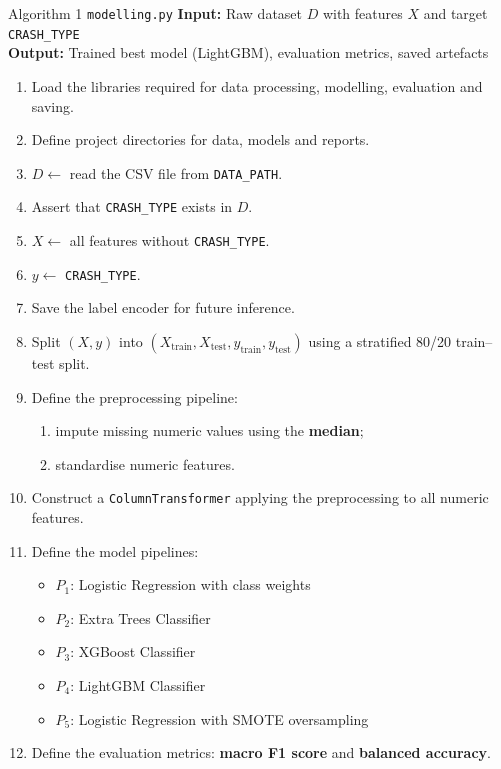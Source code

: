 \documentclass[11pt,a4paper]{article}
\newcommand{\feat}[1]{\texttt{#1}}
\begin{document}
\begin{algobox}{Algorithm 1 \quad \texttt{modelling.py}}
\textbf{Input:} Raw dataset $D$ with features $X$ and target \feat{CRASH\_TYPE}\\
\textbf{Output:} Trained best model (LightGBM), evaluation metrics, saved artefacts

\medskip
\begin{enumerate}[label=\arabic*.]
  \item Load the libraries required for data processing, modelling, evaluation and saving.
  \item Define project directories for data, models and reports.
  \item $D \leftarrow$ read the CSV file from \texttt{DATA\_PATH}.
  \item Assert that \feat{CRASH\_TYPE} exists in $D$.
  \item $X \leftarrow$ all features without \feat{CRASH\_TYPE}.
  \item $y \leftarrow$ \feat{CRASH\_TYPE}.
  \item Save the label encoder for future inference.
  \item Split $(X, y)$ into $(X_{\text{train}}, X_{\text{test}}, y_{\text{train}},
        y_{\text{test}})$ using a stratified 80/20 train--test split.
  \item Define the preprocessing pipeline:
    \begin{enumerate}[label=(\alph*)]
      \item impute missing numeric values using the \textbf{median};
      \item standardise numeric features.
    \end{enumerate}
  \item Construct a \texttt{ColumnTransformer} applying the preprocessing to all numeric features.
  \item Define the model pipelines:
    \begin{itemize}
      \item $P_1$: Logistic Regression with class weights
      \item $P_2$: Extra Trees Classifier
      \item $P_3$: XGBoost Classifier
      \item $P_4$: LightGBM Classifier
      \item $P_5$: Logistic Regression with SMOTE oversampling
    \end{itemize}
  \item Define the evaluation metrics: \textbf{macro F1 score} and \textbf{balanced accuracy}.

\end{enumerate}
\end{algobox}
\end{document}
